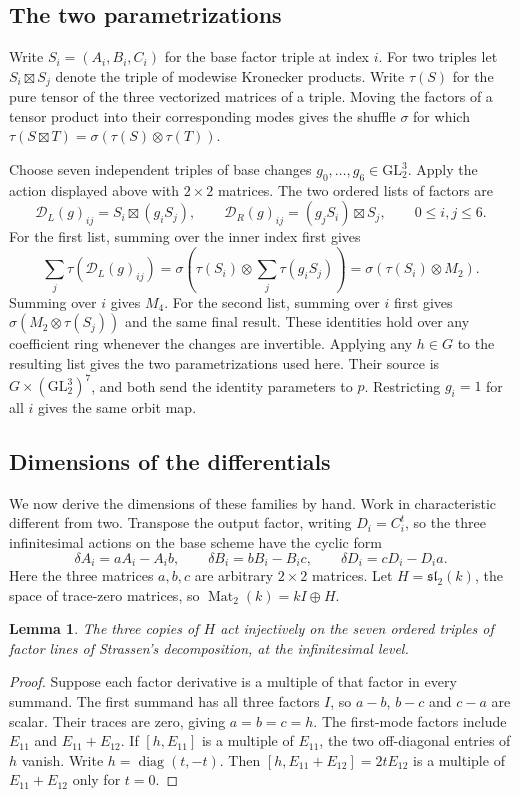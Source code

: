 \documentclass[11pt]{amsart}
\newtheorem{lemma}[theorem]{Lemma}
\begin{document}
\subsection{The two parametrizations}

Write $S_i=(A_i,B_i,C_i)$ for the base factor triple at index $i$.
For two triples let $S_i\boxtimes S_j$ denote the triple of
modewise Kronecker products. Write $\tau(S)$ for the pure tensor
of the three vectorized matrices of a triple. Moving the factors
of a tensor product into their corresponding modes gives the shuffle
$\sigma$ for which $\tau(S\boxtimes T)=\sigma(\tau(S)\otimes\tau(T))$.

Choose seven independent triples of base changes
$g_0,\ldots,g_6\in\mathrm{GL}_2^3$. Apply the action displayed above
with $2\times2$ matrices. The two ordered lists of factors are
\[
  \mathcal D_L(g)_{ij}=S_i\boxtimes(g_iS_j),\qquad
  \mathcal D_R(g)_{ij}=(g_jS_i)\boxtimes S_j,\qquad 0\le i,j\le6.
\]
For the first list, summing over the inner index first gives
\[
 \sum_j \tau(\mathcal D_L(g)_{ij})
   =\sigma\!\left(\tau(S_i)\otimes\sum_j\tau(g_i S_j)\right)
   =\sigma(\tau(S_i)\otimes M_2).
\]
Summing over $i$ gives $M_4$. For the second list, summing over $i$
first gives $\sigma(M_2\otimes\tau(S_j))$ and the same final result.
These identities hold over any coefficient ring whenever the changes
are invertible. Applying any $h\in G$ to the resulting list gives the
two parametrizations used here. Their source is
$G\times(\mathrm{GL}_2^3)^7$, and both send the identity parameters to
$p$. Restricting $g_i=1$ for all $i$ gives the same orbit map.

\subsection{Dimensions of the differentials}

We now derive the dimensions of these families by hand. Work in
characteristic different from two. Transpose the output factor, writing
$D_i=C_i^t$, so the three infinitesimal actions on the base scheme
have the cyclic form
\[
 \delta A_i = aA_i-A_i b,\qquad
 \delta B_i = bB_i-B_i c,\qquad
 \delta D_i = cD_i-D_i a.
\]
Here the three matrices $a,b,c$ are arbitrary $2\times2$ matrices.
Let $H=\mathfrak{sl}_2(k)$, the space of trace-zero matrices, so
$\operatorname{Mat}_2(k)=kI\oplus H$.

\begin{lemma}\label{lem:base}
The three copies of $H$ act injectively on the seven ordered triples
of factor lines of Strassen's decomposition, at the infinitesimal level.
\end{lemma}
\begin{proof}
Suppose each factor derivative is a multiple of that factor in every
summand. The first summand has all three factors $I$, so $a-b$,
$b-c$ and $c-a$ are scalar. Their traces are zero, giving $a=b=c=h$.
The first-mode factors include $E_{11}$ and $E_{11}+E_{12}$.
If $[h,E_{11}]$ is a multiple of $E_{11}$, the two off-diagonal
entries of $h$ vanish. Write $h=\operatorname{diag}(t,-t)$.
Then $[h,E_{11}+E_{12}]=2t E_{12}$ is a multiple of
$E_{11}+E_{12}$ only for $t=0$.
\end{proof}
\end{document}
